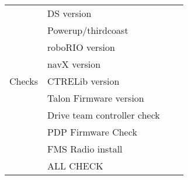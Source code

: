 \documentclass{article}
\begin{document}
\begin{tabular}{l|l|l|l}
\multirow{9}{*}{Checks}     &  DS version &\\ \cline{2-3}
&  Powerup/thirdcoast &\\ \cline{2-3}
& roboRIO version & \\ \cline{2-3}
& navX version & \\ \cline{2-3}
& CTRELib version & \\ \cline{2-3}
& Talon Firmware version & \\ \cline{2-3}
& Drive team controller check & \\ \cline{2-3}
﻿& PDP Firmware Check & \\ \cline{2-3}
& FMS Radio install & \\ \hline \hline \hline

& ALL CHECK     &  \\ \cline{2-3}

\end{tabular}
\end{document}
